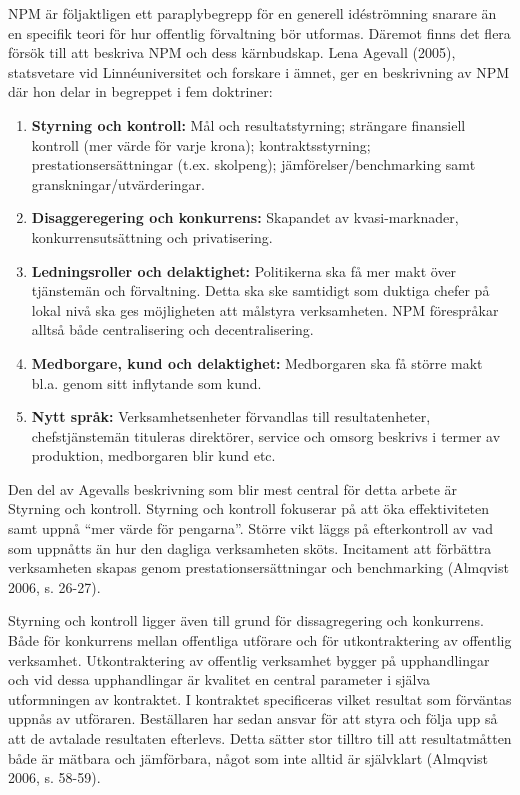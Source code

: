 NPM är följaktligen ett paraplybegrepp för en generell idéströmning snarare än en specifik teori för hur offentlig förvaltning bör utformas. Däremot finns det flera försök till att beskriva NPM och dess kärnbudskap. Lena Agevall (2005), statsvetare vid Linnéuniversitet och forskare i ämnet, ger en beskrivning av NPM där hon delar in begreppet i fem doktriner:

\begin{enumerate}
  \item \textbf{Styrning och kontroll:} Mål och resultatstyrning; strängare finansiell kontroll (mer värde för varje krona); kontraktsstyrning; prestationsersättningar (t.ex. skolpeng); jämförelser/benchmarking samt granskningar/utvärderingar.
  \item \textbf{Disaggeregering och konkurrens:} Skapandet av kvasi-marknader, konkurrensutsättning och privatisering.
  \item \textbf{Ledningsroller och delaktighet:} Politikerna ska få mer makt över tjänstemän och förvaltning. Detta ska ske samtidigt som duktiga chefer på lokal nivå ska ges möjligheten att målstyra verksamheten. NPM förespråkar alltså både centralisering och decentralisering.
  \item \textbf{Medborgare, kund och delaktighet:} Medborgaren ska få större makt bl.a. genom sitt inflytande som kund.
  \item \textbf{Nytt språk:} Verksamhetsenheter förvandlas till resultatenheter, chefstjänstemän tituleras direktörer, service och omsorg beskrivs i termer av produktion, medborgaren blir kund etc.
\end{enumerate}

Den del av Agevalls beskrivning som blir mest central för detta arbete är Styrning och kontroll. Styrning och kontroll fokuserar på att öka effektiviteten samt uppnå “mer värde för pengarna”. Större vikt läggs på efterkontroll av vad som uppnåtts än hur den dagliga verksamheten sköts. Incitament att förbättra verksamheten skapas genom prestationsersättningar och benchmarking (Almqvist 2006, s. 26-27).
 
Styrning och kontroll ligger även till grund för dissagregering och konkurrens. Både för konkurrens mellan offentliga utförare och för utkontraktering av offentlig verksamhet. Utkontraktering av offentlig verksamhet bygger på upphandlingar och vid dessa upphandlingar är kvalitet en central parameter i själva utformningen av kontraktet. I kontraktet specificeras vilket resultat som förväntas uppnås av utföraren. Beställaren har sedan ansvar för att styra och följa upp så att de avtalade resultaten efterlevs. Detta sätter stor tilltro till att resultatmåtten både är mätbara och jämförbara, något som inte alltid är självklart (Almqvist 2006, s. 58-59).
 
